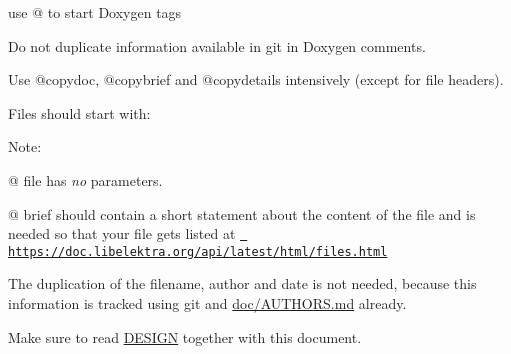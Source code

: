 \begin{DoxyItemize}
\item use {\ttfamily @} to start Doxygen tags
\item Do not duplicate information available in git in Doxygen comments.
\item Use {\ttfamily @copydoc}, {\ttfamily @copybrief} and {\ttfamily @copydetails} intensively (except for file headers).
\end{DoxyItemize}

Files should start with\+:


\begin{DoxyCode}{0}
\DoxyCodeLine{}
\end{DoxyCode}


Note\+:


\begin{DoxyItemize}
\item {\ttfamily @} {\ttfamily file} has {\itshape no} parameters.
\item {\ttfamily @} {\ttfamily brief} should contain a short statement about the content of the file and is needed so that your file gets listed at \href{https://doc.libelektra.org/api/latest/html/files.html}{\texttt{ https\+://doc.\+libelektra.\+org/api/latest/html/files.\+html}}
\end{DoxyItemize}

The duplication of the filename, author and date is not needed, because this information is tracked using git and \mbox{\hyperlink{doc_AUTHORS_md}{doc/\+A\+U\+T\+H\+O\+RS.md}} already.


\begin{DoxyItemize}
\item Make sure to read \mbox{\hyperlink{doc_DESIGN_md}{D\+E\+S\+I\+GN}} together with this document. 
\end{DoxyItemize}